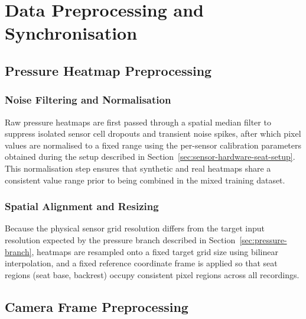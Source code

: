 \chapter{Data Preprocessing and Synchronisation}
\label{ch:preprocessing-sync}

\section{Pressure Heatmap Preprocessing}
\label{sec:pressure-preprocessing}

\subsection{Noise Filtering and Normalisation}
\label{sec:pressure-noise-filtering}
Raw pressure heatmaps are first passed through a spatial median filter to
suppress isolated sensor cell dropouts and transient noise spikes, after
which pixel values are normalised to a fixed range using the per-sensor
calibration parameters obtained during the setup described in
Section~\ref{sec:sensor-hardware-seat-setup}. This normalisation step
ensures that synthetic and real heatmaps share a consistent value range
prior to being combined in the mixed training dataset.

\subsection{Spatial Alignment and Resizing}
\label{sec:pressure-spatial-alignment}
Because the physical sensor grid resolution differs from the target input
resolution expected by the pressure branch described in
Section~\ref{sec:pressure-branch}, heatmaps are resampled onto a fixed
target grid size using bilinear interpolation, and a fixed reference
coordinate frame is applied so that seat regions (seat base, backrest)
occupy consistent pixel regions across all recordings.

\section{Camera Frame Preprocessing}
\label{sec:camera-preprocessing}

